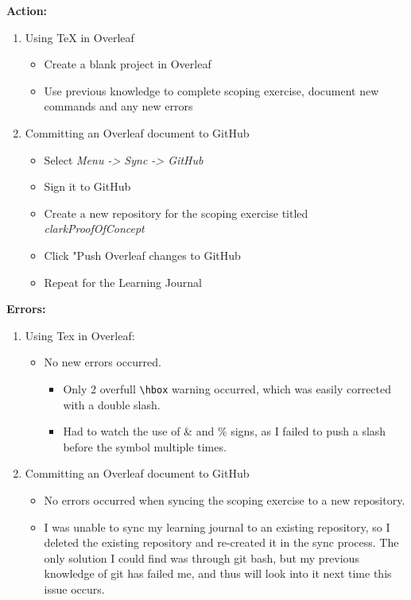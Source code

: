 \documentclass{article}
\begin{document}
\textbf{Action:}
\begin{enumerate}
    \item Using TeX in Overleaf
    \begin{itemize}
        \item Create a blank project in Overleaf
        \item Use previous knowledge to complete scoping exercise, document new commands and any new errors
    \end{itemize}
    \item Committing an Overleaf document to GitHub
    \begin{itemize}
        \item Select \textit{Menu -> Sync -> GitHub}
        \item Sign it to GitHub
        \item Create a new repository for the scoping exercise titled \textit{clarkProofOfConcept}
        \item Click "Push Overleaf changes to GitHub
        \item Repeat for the Learning Journal
    \end{itemize}
\end{enumerate}
\textbf{Errors:}
\begin{enumerate}
    \item Using Tex in Overleaf:
    \begin{itemize}
        \item No new errors occurred. 
        \begin{itemize}
            \item Only 2 overfull \verb|\hbox| warning occurred, which was easily corrected with a double slash.
            \item Had to watch the use of \& and \% signs, as I failed to push a slash before the symbol multiple times.
        \end{itemize}
    \end{itemize}
    \item Committing an Overleaf document to GitHub
    \begin{itemize}
        \item No errors occurred when syncing the scoping exercise to a new repository.
        \item I was unable to sync my learning journal to an existing repository, so I deleted the existing repository and re-created it in the sync process. The only solution I could find was through git bash, but my previous knowledge of git has failed me, and thus will look into it next time this issue occurs.
    \end{itemize}
\end{enumerate}
\end{document}
